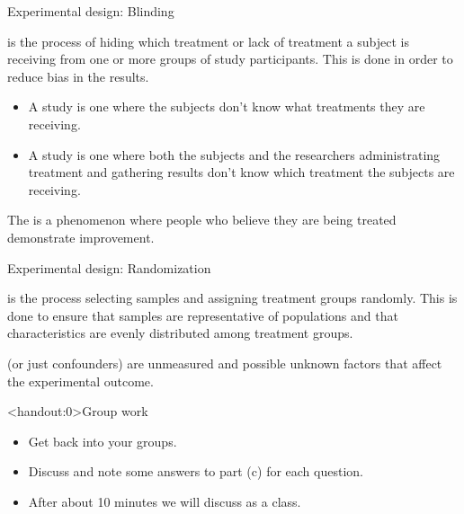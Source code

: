 \documentclass[xcolor=table]{beamer}
\begin{document}
\begin{frame}{Experimental design: Blinding}
\begin{block}{}
\large
{} is the process of hiding which treatment or lack of treatment a subject is receiving from one or more groups of study participants. This is done in order to reduce bias in the results.

\begin{itemize}
\pause\item A  study is one where the subjects don't know what treatments they are receiving.

\pause\item A  study is one where both the subjects and the researchers administrating treatment and gathering results don't know which treatment the subjects are receiving.
\end{itemize}
\end{block}

\pause
\begin{block}{}
\large
The  is a phenomenon where people who believe they are being treated demonstrate improvement.
\end{block}
\end{frame}

\begin{frame}{Experimental design: Randomization}

\begin{block}{}
\large
{} is the process selecting samples and assigning treatment groups randomly. This is done to ensure that samples are representative of populations and that characteristics are evenly distributed among treatment groups.
\end{block}

\pause
\begin{block}{}
\large
{} (or just confounders) are unmeasured and possible unknown factors that affect the experimental outcome. 
\end{block}
\end{frame}

\begin{frame}<handout:0>{Group work}
\begin{block}{}
\large
\begin{itemize}
\item Get back into your groups.
\item Discuss and note some answers to part (c) for each question.
\item After about 10 minutes we will discuss as a class. 
\end{itemize}
\end{block}
\end{frame}
\end{document}

